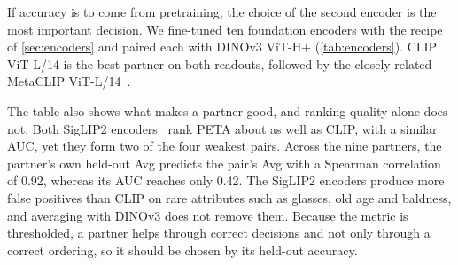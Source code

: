 \documentclass[10pt,twocolumn,letterpaper]{article}
\begin{document}
If accuracy is to come from pretraining, the choice of the second encoder is the most important decision. We fine-tuned ten foundation encoders with the recipe of \cref{sec:encoders} and paired each with DINOv3 ViT-H+ (\cref{tab:encoders}). CLIP ViT-L/14 is the best partner on both readouts, followed by the closely related MetaCLIP ViT-L/14~\cite{metaclip}.

The table also shows what makes a partner good, and ranking quality alone does not. Both SigLIP2 encoders~\cite{siglip2} rank PETA about as well as CLIP, with a similar AUC, yet they form two of the four weakest pairs. Across the nine partners, the partner's own held-out Avg predicts the pair's Avg with a Spearman correlation of 0.92, whereas its AUC reaches only 0.42. The SigLIP2 encoders produce more false positives than CLIP on rare attributes such as glasses, old age and baldness, and averaging with DINOv3 does not remove them. Because the metric is thresholded, a partner helps through correct decisions and not only through a correct ordering, so it should be chosen by its held-out accuracy.

\begin{table}[t]
\centering\small
\setlength{\tabcolsep}{2.6pt}
\caption{Encoders alone and paired with DINOv3 ViT-H+ by logit averaging, with PETA held out during training.}
\label{tab:encoders}
\end{table}
\end{document}
